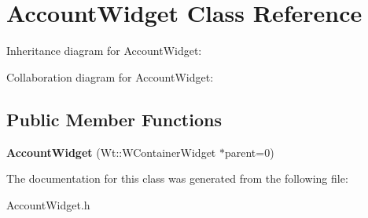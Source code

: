 \hypertarget{classAccountWidget}{}\section{Account\+Widget Class Reference}
\label{classAccountWidget}


Inheritance diagram for Account\+Widget\+:


Collaboration diagram for Account\+Widget\+:
\subsection*{Public Member Functions}
\begin{DoxyCompactItemize}
\item 
\mbox{\label{classAccountWidget_a99520d7974cbe0e4ab061b3a79cf472f}} 
{\bfseries Account\+Widget} (Wt\+::\+W\+Container\+Widget $\ast$parent=0)
\end{DoxyCompactItemize}


The documentation for this class was generated from the following file\+:\begin{DoxyCompactItemize}
\item 
Account\+Widget.\+h\end{DoxyCompactItemize}

